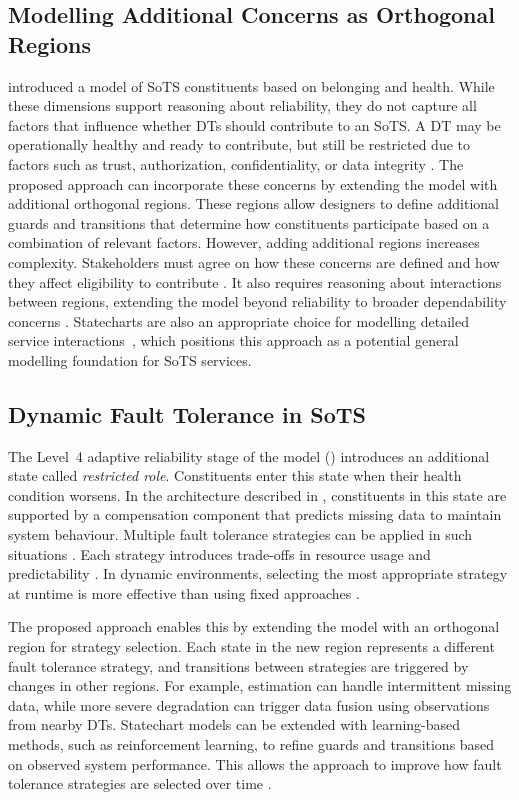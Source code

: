 \subsection{Modelling Additional Concerns as Orthogonal Regions}
 introduced a model of SoTS constituents based on belonging and health. While these dimensions support reasoning about reliability, they do not capture all factors that influence whether DTs should contribute to an SoTS. A DT may be operationally healthy and ready to contribute, but still be restricted due to factors such as trust, authorization, confidentiality, or data integrity \cite{kuruppuarachchi2023trusted}. The proposed approach can incorporate these concerns by extending the model with additional orthogonal regions. These regions allow designers to define additional guards and transitions that determine how constituents participate based on a combination of relevant factors. However, adding additional regions increases complexity. Stakeholders must agree on how these concerns are defined and how they affect eligibility to contribute \cite{carney2005topics}. It also requires reasoning about interactions between regions, extending the model beyond reliability to broader dependability concerns \cite{avizienis2004basic}. Statecharts are also an appropriate choice for modelling detailed service interactions~\cite{vanmierlo2018multi}, which positions this approach as a potential general modelling foundation for SoTS services.

\subsection{Dynamic Fault Tolerance in SoTS}
The Level~4 adaptive reliability stage of the model () introduces an additional state called \textit{restricted role}. Constituents enter this state when their health condition worsens. In the architecture described in , constituents in this state are supported by a compensation component that predicts missing data to maintain system behaviour. Multiple fault tolerance strategies can be applied in such situations \cite{hanmer2013patterns}. Each strategy introduces trade-offs in resource usage and predictability \cite{narasimhan2002trade-offs}. In dynamic environments, selecting the most appropriate strategy at runtime is more effective than using fixed approaches \cite{ballesteros2022infrastructure}. 

The proposed approach enables this by extending the model with an orthogonal region for strategy selection. Each state in the new region represents a different fault tolerance strategy, and transitions between strategies are triggered by changes in other regions. For example, estimation can handle intermittent missing data, while more severe degradation can trigger data fusion using observations from nearby DTs. Statechart models can be extended with learning-based methods, such as reinforcement learning, to refine guards and transitions based on observed system performance. This allows the approach to improve how fault tolerance strategies are selected over time \cite{dong2023deep}.

